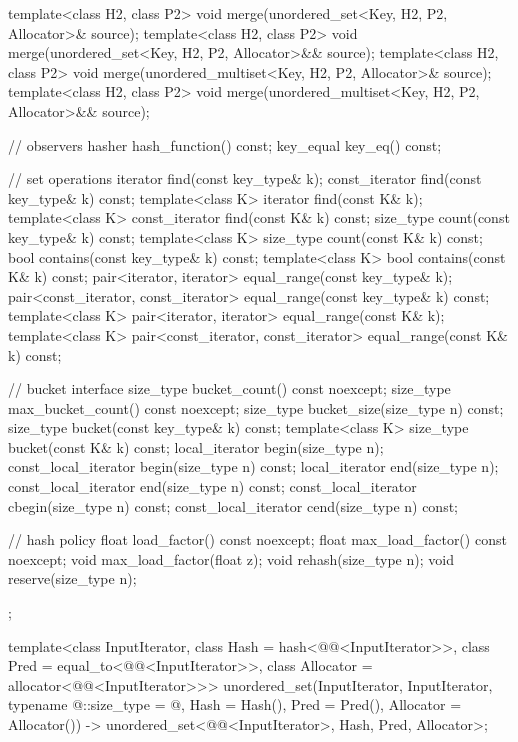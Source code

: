 \begin{codeblock}
{{    template<class H2, class P2>
      void merge(unordered_set<Key, H2, P2, Allocator>& source);
    template<class H2, class P2>
      void merge(unordered_set<Key, H2, P2, Allocator>&& source);
    template<class H2, class P2>
      void merge(unordered_multiset<Key, H2, P2, Allocator>& source);
    template<class H2, class P2>
      void merge(unordered_multiset<Key, H2, P2, Allocator>&& source);

    // observers
    hasher hash_function() const;
    key_equal key_eq() const;

    // set operations
    iterator         find(const key_type& k);
    const_iterator   find(const key_type& k) const;
    template<class K>
      iterator       find(const K& k);
    template<class K>
      const_iterator find(const K& k) const;
    size_type        count(const key_type& k) const;
    template<class K>
      size_type      count(const K& k) const;
    bool             contains(const key_type& k) const;
    template<class K>
      bool           contains(const K& k) const;
    pair<iterator, iterator>               equal_range(const key_type& k);
    pair<const_iterator, const_iterator>   equal_range(const key_type& k) const;
    template<class K>
      pair<iterator, iterator>             equal_range(const K& k);
    template<class K>
      pair<const_iterator, const_iterator> equal_range(const K& k) const;

    // bucket interface
    size_type bucket_count() const noexcept;
    size_type max_bucket_count() const noexcept;
    size_type bucket_size(size_type n) const;
    size_type bucket(const key_type& k) const;
    template<class K> size_type bucket(const K& k) const;
    local_iterator begin(size_type n);
    const_local_iterator begin(size_type n) const;
    local_iterator end(size_type n);
    const_local_iterator end(size_type n) const;
    const_local_iterator cbegin(size_type n) const;
    const_local_iterator cend(size_type n) const;

    // hash policy
    float load_factor() const noexcept;
    float max_load_factor() const noexcept;
    void max_load_factor(float z);
    void rehash(size_type n);
    void reserve(size_type n);
  };

  template<class InputIterator,
           class Hash = hash<@@<InputIterator>>,
           class Pred = equal_to<@@<InputIterator>>,
           class Allocator = allocator<@@<InputIterator>>>
    unordered_set(InputIterator, InputIterator, typename @\seebelow@::size_type = @\seebelow@,
                  Hash = Hash(), Pred = Pred(), Allocator = Allocator())
      -> unordered_set<@@<InputIterator>,
                       Hash, Pred, Allocator>;

}
\end{codeblock}

